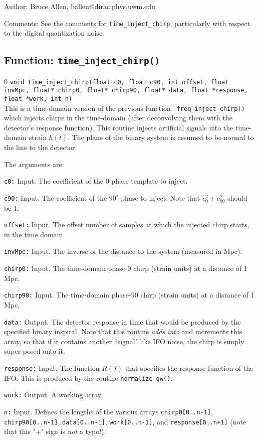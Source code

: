 \begin{description}
\item{Author:}
Bruce Allen, ballen@dirac.phys.uwm.edu
\item{Comments:}
See the comments for {\tt time\_inject\_chirp}, particularly with respect to
the digital quantization noise.
\end{description}
\clearpage

\subsection{Function: {\tt time\_inject\_chirp()}}
\label{ss:time_inject_chirp}
\setcounter{equation}0
{\tt void time\_inject\_chirp(float c0, float c90, int offset, float
    invMpc, float* chirp0, float* chirp90, float* data, float *response, float *work, int n) }\\
This is a time-domain version of the previous function {\tt
freq\_inject\_chirp()} which injects chirps in the time-domain (after
deconvolving them with the detector's response function).  This routine
injects artificial signals into the time-domain strain $h(t)$.  The
plane of the binary system is assumed to be normal to the line to the
detector.

The arguments are:
\begin{description}
\item{\tt c0:} Input. The coefficient of the 0-phase template to inject.
\item{\tt c90:} Input. The coefficient of the $90^\circ$-phase to
   inject.  Note that $c_0^2 + c_{90}^2$ should be 1.
\item{\tt offset:} Input. The offset number of samples at which the injected chirp starts, in the
   time domain.
\item{\tt invMpc:} Input. The inverse of the distance to the system (measured in Mpc).
\item{\tt chirp0:} Input. The time-domain phase-0 chirp (strain units) at a distance of 1 Mpc.
\item{\tt chirp90:} Input. The time-domain phase-90 chirp (strain units) at a distance of 1 Mpc.
\item{\tt data:} Output. The detector response in time that would be produced by the
 specified binary inspiral.  Note that this routine {\it adds into} and
 increments this array, so that if it contains another ``signal" like
 IFO noise, the chirp is simply super-posed onto it.
\item{\tt response:} Input. The function $R(f)$ that specifies the response function of the
 IFO.  This is produced by the routine {\tt normalize\_gw()}.
\item{\tt work:} Output. A working array.
\item{\tt n:} Input.  Defines the lengths of the various arrays {\tt chirp0[0..n-1]},
{\tt chirp90[0..n-1]}, {\tt data[0..n-1]}, {\tt work[0..n-1]}, and {\tt response[0..n+1]} (note that
this "+" sign is {\it not} a typo!).
\end{description}

